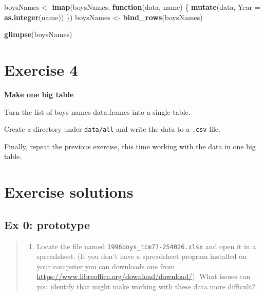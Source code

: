\documentclass[]{book}
\newenvironment{Shaded}{\begin{snugshade}}{\end{snugshade}}
\newcommand{\KeywordTok}[1]{\textcolor[rgb]{0.13,0.29,0.53}{\textbf{#1}}}
\newcommand{\DataTypeTok}[1]{\textcolor[rgb]{0.13,0.29,0.53}{#1}}
\newcommand{\StringTok}[1]{\textcolor[rgb]{0.31,0.60,0.02}{#1}}
\newcommand{\ControlFlowTok}[1]{\textcolor[rgb]{0.13,0.29,0.53}{\textbf{#1}}}
\newcommand{\NormalTok}[1]{#1}
\providecommand{\tightlist}{%
  \setlength{\itemsep}{0pt}\setlength{\parskip}{0pt}}
\begin{document}
\begin{Shaded}
\begin{Highlighting}[]
\NormalTok{boysNames <-}\StringTok{ }\KeywordTok{imap}\NormalTok{(boysNames,}
                  \ControlFlowTok{function}\NormalTok{(data, name) \{}
                      \KeywordTok{mutate}\NormalTok{(data, }\DataTypeTok{Year =} \KeywordTok{as.integer}\NormalTok{(name))}
\NormalTok{                      \})}
\NormalTok{boysNames <-}\StringTok{ }\KeywordTok{bind_rows}\NormalTok{(boysNames)}

\KeywordTok{glimpse}\NormalTok{(boysNames)}
\end{Highlighting}
\end{Shaded}

\section{Exercise 4}\label{exercise-4-1}

\textbf{Make one big table}

Turn the list of boys names data.frames into a single table.

Create a directory under \texttt{data/all} and write the data to a
\texttt{.csv} file.

Finally, repeat the previous exercise, this time working with the data
in one big table.

\section{Exercise solutions}\label{exercise-solutions-3}

\subsection{Ex 0: prototype}\label{ex-0-prototype-3}

\begin{quote}
\begin{enumerate}
\def\labelenumi{\arabic{enumi}.}
\tightlist
\item
  Locate the file named \texttt{1996boys\_tcm77-254026.xlsx} and open it
  in a spreadsheet. (If you don't have a spreadsheet program installed
  on your computer you can downloads one from
  \url{https://www.libreoffice.org/download/download/}). What issues can
  you identify that might make working with these data more difficult?
\end{enumerate}
\end{quote}
\end{document}
